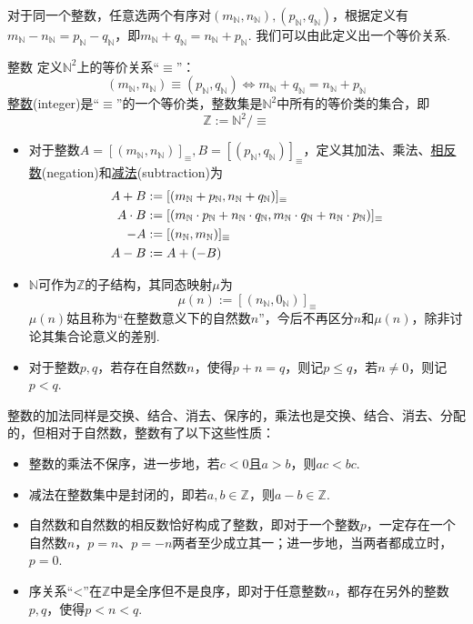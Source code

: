 \documentclass[main.tex]{subfiles}
\begin{document}
对于同一个整数，任意选两个有序对\((m_{\mathbb{N}},n_{\mathbb{N}}),(p_{\mathbb{N}},q_{\mathbb{N}})\)，根据定义有\(m_{\mathbb{N}}-n_{\mathbb{N}} = p_{\mathbb{N}}-q_{\mathbb{N}}\)，即\(m_{\mathbb{N}}+q_{\mathbb{N}}=n_{\mathbb{N}}+p_{\mathbb{N}}\). 我们可以由此定义出一个等价关系.

\begin{definition}{整数}
    定义\(\mathbb{N}^2\)上的等价关系“\(\equiv\)”：
    \[(m_{\mathbb{N}},n_{\mathbb{N}}) \equiv (p_{\mathbb{N}},q_{\mathbb{N}}) \Leftrightarrow m_{\mathbb{N}}+q_{\mathbb{N}}=n_{\mathbb{N}}+p_{\mathbb{N}}\]
    \uline{整数}(integer)是“\(\equiv\)”的一个等价类，整数集是\(\mathbb{N}^2\)中所有的等价类的集合，即
    \[\mathbb{Z} := \mathbb{N}^2/\equiv\]
    \begin{itemize}
        \item  对于整数\(A = [(m_{\mathbb{N}},n_{\mathbb{N}})]_{\equiv}, B = [(p_{\mathbb{N}},q_{\mathbb{N}})]_{\equiv}\)，定义其加法、乘法、\uline{相反数}(negation)和\uline{减法}(subtraction)为
        \[
            \begin{aligned}
                \relax A+B &:= [(m_{\mathbb{N}}+p_{\mathbb{N}},n_{\mathbb{N}}+q_{\mathbb{N}})]_{\equiv}\\
                A \cdot B &:= [(m_{\mathbb{N}} \cdot p_{\mathbb{N}} + n_{\mathbb{N}} \cdot q_{\mathbb{N}}, m_{\mathbb{N}} \cdot q_{\mathbb{N}} + n_{\mathbb{N}} \cdot p_{\mathbb{N}})]_\equiv \\
                -A &:= [(n_{\mathbb{N}},m_{\mathbb{N}})]_{\equiv} \\
                A-B &:= A + (-B)
            \end{aligned}
        \]
        \item  \(\mathbb{N}\)可作为\(\mathbb{Z}\)的子结构，其同态映射\(\mu\)为
        \[\mu(n) := [(n_{\mathbb{N}},0_{\mathbb{N}})]_{\equiv}\]
        \(\mu(n)\)姑且称为“在整数意义下的自然数\(n\)”，今后不再区分\(n\)和\(\mu(n)\)，除非讨论其集合论意义的差别.
        \item  对于整数\(p,q\)，若存在自然数\(n\)，使得\(p+n=q\)，则记\(p\leq q\)，若\(n \neq 0\)，则记\(p < q\).
    \end{itemize}
\end{definition}

整数的加法同样是交换、结合、消去、保序的，乘法也是交换、结合、消去、分配的，但相对于自然数，整数有了以下这些性质：
\begin{itemize}
    \item 整数的乘法不保序，进一步地，若\(c<0\)且\(a>b\)，则\(ac<bc\).
    \item 减法在整数集中是封闭的，即若\(a,b \in \mathbb{Z}\)，则\(a-b \in \mathbb{Z}\).
    \item 自然数和自然数的相反数恰好构成了整数，即对于一个整数\(p\)，一定存在一个自然数\(n\)，\(p=n\)、\(p=-n\)两者至少成立其一；进一步地，当两者都成立时，\(p=0\).
    \item 序关系“<”在\(\mathbb{Z}\)中是全序但不是良序，即对于任意整数\(n\)，都存在另外的整数\(p,q\)，使得\(p<n<q\).
\end{itemize}
\end{document}
